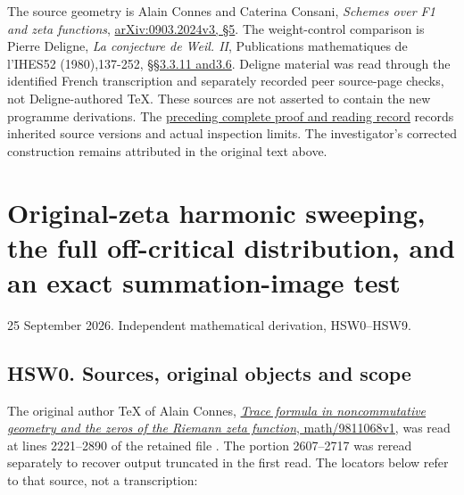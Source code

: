 The source geometry is Alain Connes and Caterina Consani, \emph{Schemes
over F1 and zeta functions},
\href{https://arxiv.org/abs/0903.2024v3}{arXiv:0903.2024v3, §5}. The
weight-control comparison is Pierre Deligne, \emph{La conjecture de
Weil. II}, Publications mathematiques de l'IHES52 (1980),137-252,
\href{https://www.numdam.org/item/PMIHES_1980__52__137_0/}{§§3.3.11
and3.6}. Deligne material was read through the identified French
transcription and separately recorded peer source-page checks, not
Deligne-authored TeX. These sources are not asserted to contain the new
programme derivations. The
\href{https://github.com/KokunoYumeto/zeta-function-research-reader/blob/36a82ecca98addb8a98b48204e349737856c7223/workbenches/splitzero-tandem/continuations/20260924-cohomology-weight-and-character-lifts/BUILD_AND_REVIEW.md}{preceding
complete proof and reading record} records inherited source versions and
actual inspection limits. The investigator's corrected construction
remains attributed in the original text above.

\chapter{Original-zeta harmonic sweeping, the full off-critical
distribution, and an exact summation-image
test}\label{original-zeta-harmonic-sweeping-the-full-off-critical-distribution-and-an-exact-summation-image-test}

25 September 2026. Independent mathematical derivation, HSW0--HSW9.

\section{HSW0. Sources, original objects and
scope}\label{hsw0.-sources-original-objects-and-scope}

The original author TeX of Alain Connes,
\href{https://arxiv.org/abs/math/9811068v1}{\emph{Trace formula in
noncommutative geometry and the zeros of the Riemann zeta function},
math/9811068v1}, was read at lines 2221--2890 of the retained file
\href{https://arxiv.org/abs/math/9811068v1}{}.
The portion 2607--2717 was reread separately to recover output truncated
in the first read. The locators below refer to that source, not a
transcription:

